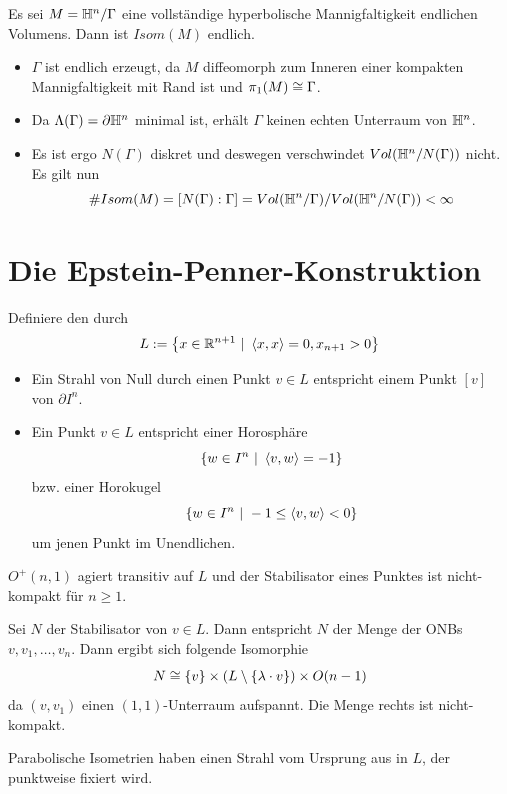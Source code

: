 \documentclass{book}
\begin{document}
\Kor{}
Es sei $M = \mathbb{H}^n / \Gamma$ eine vollständige hyperbolische Mannigfaltigkeit endlichen Volumens. Dann ist $Isom(M)$ endlich.
\begin{Beweis}{}
	\begin{itemize}
		\item $\Gamma$ ist endlich erzeugt, da $M$ diffeomorph zum Inneren einer kompakten Mannigfaltigkeit mit Rand ist und $\pi_1(M) \overset{}{\cong} \Gamma$.
		\item Da $\Lambda(\Gamma) = \partial \mathbb{H}^n$ minimal ist, erhält $\Gamma$ keinen echten Unterraum von $\mathbb{H}^n$.
		\item Es ist ergo $N(\Gamma)$ diskret und deswegen verschwindet $Vol(\mathbb{H}^n / N(\Gamma))$ nicht. Es gilt nun
		\[ \# Isom(M) = [N(\Gamma) : \Gamma] = Vol(\mathbb{H}^n /\Gamma) / Vol(\mathbb{H}^n / N(\Gamma)) < \infty \]
	\end{itemize}
\end{Beweis}

\section{Die Epstein-Penner-Konstruktion}
\Def{}
Definiere den  durch
\[ L := \set{x\in \R^{n+1}}{\shrp{x,x} = 0, x_{n+1} > 0} \]

\Bem{}
\begin{itemize}
	\item Ein Strahl von Null durch einen Punkt $v\in L$ entspricht einem Punkt $[v]$ von $\partial I^n$.
	\item Ein Punkt $v \in L$ entspricht einer Horosphäre
	\[ \set{w \in I^n}{ \shrp{v,w} = -1} \]
	bzw. einer Horokugel
	\[ \set{w \in I^n}{ -1\leq \shrp{v,w} < 0} \]
	um jenen Punkt im Unendlichen.
\end{itemize}

\Lem{}
$O^+(n,1)$ agiert transitiv auf $L$ und der Stabilisator eines Punktes ist nicht-kompakt für $n \geq 1$.
\begin{Beweis}{}
	Sei $N$ der Stabilisator von $v\in L$. Dann entspricht $N$ der Menge der ONBs $v,v_1,\ldots, v_n$. Dann ergibt sich folgende Isomorphie
	\[ N \overset{}{\cong} \{v\} \times( L \setminus \{ \lambda \cdot v \}) \times O(n-1) \]
	da $(v,v_1)$ einen $(1,1)$-Unterraum aufspannt. Die Menge rechts ist nicht-kompakt.
\end{Beweis}

\Bem{}
Parabolische Isometrien haben einen Strahl vom Ursprung aus in $L$, der punktweise fixiert wird.
\end{document}
